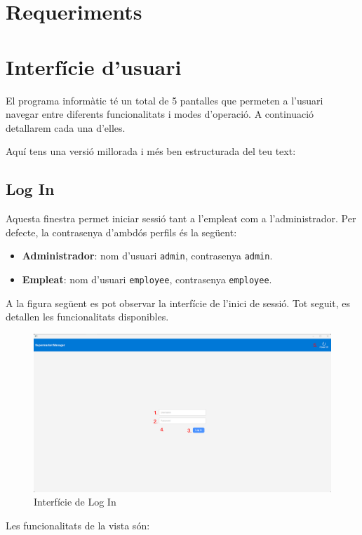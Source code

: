 \documentclass[a4paper,12pt]{article}
\begin{document}
	\section{Requeriments}
	
	\newpage
	\section{Interfície d'usuari}
	
	El programa informàtic té un total de 5 pantalles que permeten a l'usuari navegar entre diferents funcionalitats i modes d'operació. A continuació detallarem cada una d'elles.
	
	
	Aquí tens una versió millorada i més ben estructurada del teu text:
	
	\subsection*{Log In}
	
	Aquesta finestra permet iniciar sessió tant a l'empleat com a l'administrador. Per defecte, la contrasenya d'ambdós perfils és la següent:
	
	\begin{itemize}
		\item \textbf{Administrador}: nom d'usuari \texttt{admin}, contrasenya \texttt{admin}.
		\item \textbf{Empleat}: nom d'usuari \texttt{employee}, contrasenya \texttt{employee}.
	\end{itemize}
	
	A la figura següent es pot observar la interfície de l'inici de sessió. Tot seguit, es detallen les funcionalitats disponibles.
	
	\begin{figure}[H] 
		\centering
		\includegraphics[width=0.75\linewidth]{assets/login.png}
		\caption{Interfície de Log In}
	\end{figure}
	
	\noindent Les funcionalitats de la vista són:
	
\end{document}
